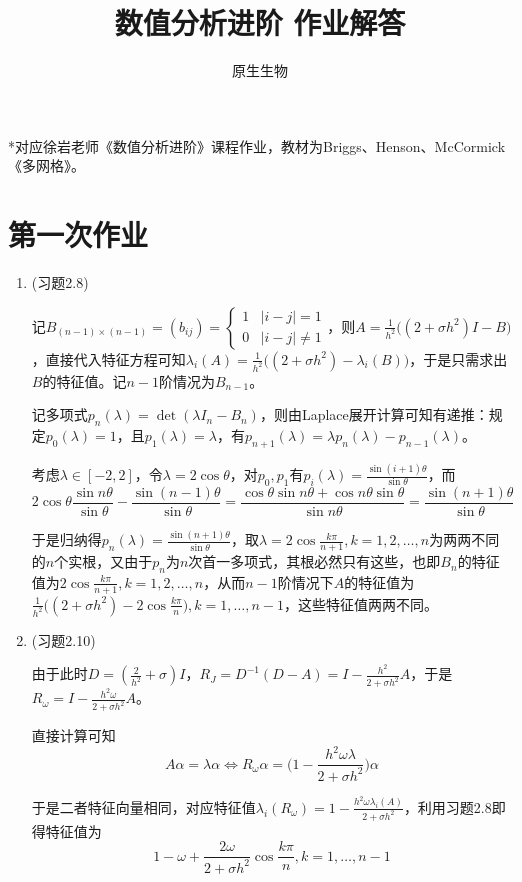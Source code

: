 \documentclass[a4paper,UTF8,fontset=windows]{ctexart}
\title{数值分析进阶 作业解答}
\author{原生生物}
\date{}
\begin{document}
\maketitle
*对应徐岩老师《数值分析进阶》课程作业，教材为Briggs、Henson、McCormick《多网格》。

\tableofcontents
\newpage
\section{第一次作业}
\begin{enumerate}
    \item (习题2.8)
    
    记$B_{(n-1)\times(n-1)}=(b_{ij})=\begin{cases}1&|i-j|=1\\0&|i-j|\ne1\end{cases}$，则$A=\frac{1}{h^2}\big((2+\sigma h^2)I-B\big)$，直接代入特征方程可知$\lambda_i(A)=\frac{1}{h^2}\big((2+\sigma h^2)-\lambda_i(B)\big)$，于是只需求出$B$的特征值。记$n-1$阶情况为$B_{n-1}$。
    
    记多项式$p_n(\lambda)=\det(\lambda I_n-B_n)$，则由Laplace展开计算可知有递推：规定$p_0(\lambda)=1$，且$p_1(\lambda)=\lambda$，有$p_{n+1}(\lambda)=\lambda p_n(\lambda)-p_{n-1}(\lambda)$。
    
    考虑$\lambda\in[-2,2]$，令$\lambda=2\cos\theta$，对$p_0,p_1$有$p_i(\lambda)=\frac{\sin(i+1)\theta}{\sin\theta}$，而
    $$2\cos\theta\frac{\sin n\theta}{\sin\theta}-\frac{\sin (n-1)\theta}{\sin\theta}=\frac{\cos\theta\sin n\theta+\cos n\theta\sin\theta}{\sin n\theta}=\frac{\sin(n+1)\theta}{\sin\theta}$$
    
    于是归纳得$p_n(\lambda)=\frac{\sin(n+1)\theta}{\sin\theta}$，取$\lambda=2\cos\frac{k\pi}{n+1},k=1,2,\dots,n$为两两不同的$n$个实根，又由于$p_n$为$n$次首一多项式，其根必然只有这些，也即$B_n$的特征值为$2\cos\frac{k\pi}{n+1},k=1,2,\dots,n$，从而$n-1$阶情况下$A$的特征值为$\frac{1}{h^2}\big((2+\sigma h^2)-2\cos\frac{k\pi}{n}\big),k=1,\dots,n-1$，这些特征值两两不同。
    
    \item (习题2.10)
    
    由于此时$D=(\frac{2}{h^2}+\sigma)I$，$R_J=D^{-1}(D-A)=I-\frac{h^2}{2+\sigma h^2}A$，于是$R_\omega=I-\frac{h^2\omega}{2+\sigma h^2}A$。
    
    直接计算可知
    $$A\alpha=\lambda\alpha\Leftrightarrow R_\omega\alpha=\bigg(1-\frac{h^2\omega\lambda}{2+\sigma h^2}\bigg)\alpha$$
    
    于是二者特征向量相同，对应特征值$\lambda_i(R_\omega)=1-\frac{h^2\omega\lambda_i(A)}{2+\sigma h^2}$，利用习题2.8即得特征值为
    $$1-\omega+\frac{2\omega}{2+\sigma h^2}\cos\frac{k\pi}{n},k=1,\dots,n-1$$
    

\end{enumerate}
\end{document}
